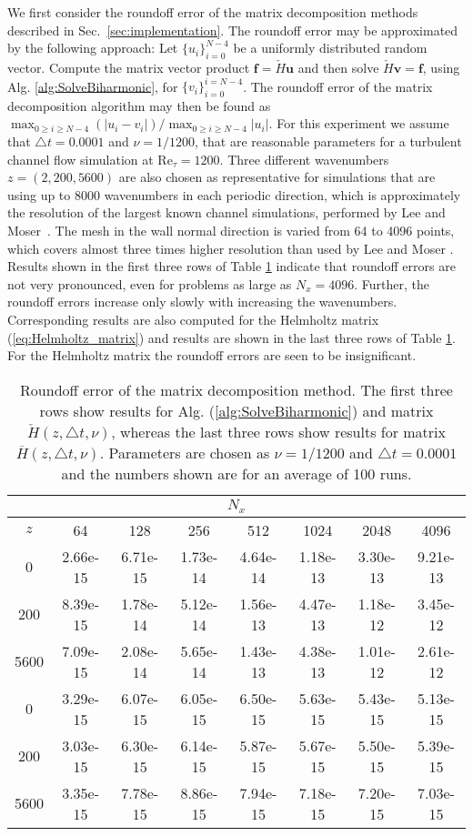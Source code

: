\documentclass[11pt, oneside]{article}
\newcommand{\N}[1]{\check{#1}}
\newcommand{\D}[1]{\overline{#1}}
\begin{document}
We first consider the roundoff error of the matrix decomposition methods 
described in Sec.~\ref{sec:implementation}. The roundoff error may be 
approximated 
by the following approach: Let $\{u_i\}_{i=0}^{N-4}$ be a uniformly distributed 
random vector. Compute the matrix vector product $\bm{f}=\N{H}\bm{u}$ and 
then solve $\N{H} \bm{v} = \bm{f}$, using Alg. \ref{alg:SolveBiharmonic}, for 
$\{v_i\}_{i=0}^{i=N-4}$. The roundoff error of the matrix decomposition 
algorithm may then be found as $\max_{0 \ge i \ge N-4}(|u_i-v_i|)/\max_{0 \ge i 
\ge N-4}|u_i|$. For this experiment we assume that $\triangle t=0.0001$ 
and $\nu=1/1200$, that are reasonable parameters for a turbulent channel flow 
simulation at $\text{Re}_{\tau}=1200$. Three different wavenumbers 
$z=(2, 200, 5600)$ are 
also chosen as representative for simulations that are using up to 8000 
wavenumbers in each periodic direction, which is approximately the resolution 
of the largest known channel simulations, performed by Lee and 
Moser~\cite{leemoser15}. The mesh in the wall normal direction 
is varied from 64 to 4096 points, which covers almost three times higher 
resolution than used by Lee and Moser \cite{leemoser15}. Results shown in the 
first three rows of Table \ref{tab:roundoff} indicate that 
roundoff errors are not very pronounced, even for problems as large as 
$N_x=4096$. Further, the roundoff errors increase only slowly with increasing 
the wavenumbers. Corresponding results are also computed for the Helmholtz 
matrix (\ref{eq:Helmholtz_matrix}) and 
results are shown in the last three rows of Table \ref{tab:roundoff}. For 
the Helmholtz matrix the roundoff errors are seen to be insignificant.

\begin{table}
	\caption{Roundoff error of the matrix decomposition method. The first three 
	rows show results for Alg. (\ref{alg:SolveBiharmonic}) and matrix $\N{H}(z, 
	\triangle t, \nu)$, whereas the last three rows show results for matrix 
	$\D{H}(z, \triangle t, \nu)$. Parameters 
	are chosen as $\nu=1/1200$ and $\triangle t=0.0001$ and the numbers shown 
	are for an average of 100 runs. }
	\label{tab:roundoff}
\begin{tabular}{cccccccc}
	   \multicolumn{8}{c}{$N_x$} \\
	   \hline
	$z$ & 64 & 128 & 256 & 512 & 1024 & 2048 & 4096 \\
	\hline
0 & 2.66e-15 & 6.71e-15 & 1.73e-14 & 4.64e-14 & 1.18e-13 & 3.30e-13 & 9.21e-13 
\\
200 & 8.39e-15 & 1.78e-14 & 5.12e-14 & 1.56e-13 & 4.47e-13 & 1.18e-12 & 
3.45e-12 \\
5600 & 7.09e-15 & 2.08e-14 & 5.65e-14 & 1.43e-13 & 4.38e-13 & 1.01e-12 & 
2.61e-12 \\
		\hline
0 & 3.29e-15 & 6.07e-15 & 6.05e-15 & 6.50e-15 & 5.63e-15 & 5.43e-15 & 5.13e-15 
\\
200 & 3.03e-15 & 6.30e-15 & 6.14e-15 & 5.87e-15 & 5.67e-15 & 5.50e-15 & 
5.39e-15 \\
5600 & 3.35e-15 & 7.78e-15 & 8.86e-15 & 7.94e-15 & 7.18e-15 & 7.20e-15 & 
7.03e-15
		
\end{tabular}
\end{table}
\end{document}
